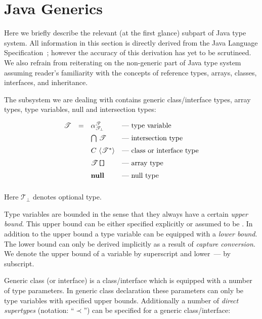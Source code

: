 \section{Java Generics}

Here we briefly describe the relevant (at the first glance) subpart of Java type system. All
information in this section is directly derived from the Java Language Specification~\cite{JLS};
however the accuracy of this derivation has yet to be scrutineed. We also refrain from
reiterating on the non-generic part of Java type system assuming reader's familiarity with the
concepts of reference types, arrays, classes, interfaces, and inheritance.

The subsystem we are dealing with contains generic class/interface types, array types,
type variables, null and intersection types:

\[
\begin{array}{rcll}
  \mathscr{T} & = & \alpha^\mathscr{T}_\mathscr{T_\bot}&\mbox{--- type variable}\\[2mm]
              &   & \bigcap\,\mathscr{T}           &\mbox{--- intersection type}\\[2mm]
              &   & {C}\,\left<{\mathscr{T}^*}\right>         &\mbox{--- class or interface type}\\[2mm]
              &   & \mathscr{T}\mbox{\texttt{[]}}    &\mbox{--- array type}\\[2mm]
              &   & \mathbf{null}                   &\mbox{--- null type}\\[2mm]
\end{array}
\]

Here $\mathscr{T}_\bot$ denotes optional type.

Type variables are bounded in the sense that they always have a certain \emph{upper bound}. This upper
bound can be either specified explicitly or assumed to be . In addition
to the upper bound a type variable can be equipped with a \emph{lower bound}. The lower bound can only
be derived implicitly as a result of \emph{capture conversion}. We denote the upper bound of a variable
by  superscript and lower~--- by subscript.

Generic class (or interface) is a class/interface which is equipped with a number of
type parameters. In generic class declaration these parameters can only be type
variables with specified upper bounds. Additionally a number of \emph{direct supertypes} (notation: ``$\prec$'')
can be specified for a generic class/interface:

